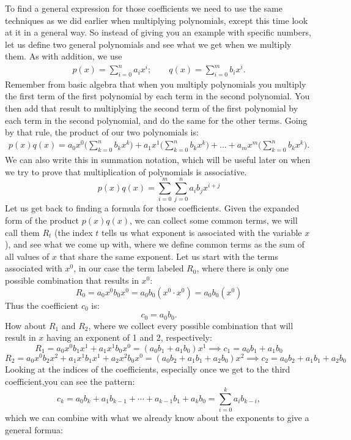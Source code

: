 To find a general expression for those coefficients we need to use the same techniques as we did earlier when multiplying polynomials, except this time look at it in a general way.  So instead of giving you an example with specific numbers, let us define two general polynomials and see what we get when we multiply them. As with addition, we use
\begin{align*}
p(x)  = \sum^{n}_{i=0} a_i x^i; \qquad
q(x)  = \sum^{m}_{i=0} b_i x^i.
\end{align*}	
Remember from basic algebra that when you multiply polynomials you multiply the first term of the first polynomial by each term in the second polynomial.  You then add that result to multiplying the second term of the first polynomial by each term in the second polynomial, and do the same for the other terms.  Going by that rule, the product of our two polynomials is:
\begin{align*}
p(x)q(x)= a_0x^0 \Big( \sum_{k=0}^n b_k x^k\Big) + a_1x^1 \Big(\sum_{k=0}^n b_k x^k \Big) + \ldots + a_mx^m \Big( \sum_{k=0}^n b_k x^k\Big). 
\end{align*}
We can also write this in summation notation, which will be useful later on when we try to prove that multiplication of polynomials is associative.
\[
p(x) q(x) =\sum_{i=0}^{m}\sum_{j=0}^{n}a_i b_j x^{i+j}
\]
Let us get back to finding a formula for those coefficients.  Given the expanded form of the product $p(x)q(x)$, we can collect some common terms, we will call them $R_t$ (the index $t$ tells us what exponent is associated with the variable $x$), and see what we come up with, where we define common terms as the sum of all values of $x$ that share the same exponent.  Let us start with the terms associated with $x^0$, in our case the term labeled $R_0$, where there is only one possible combination that results in $x^0$:
\[ R_0=a_0x^0b_0x^0 = a_0b_0(x^0\cdot x^0)=a_0b_0(x^0) \]
Thus the coefficient $c_0$ is:
\[ c_0= a_0b_0. \]
How about $R_1$ and $R_2$, where we collect every possible combination that will result in $x$ having an exponent of 1 and 2, respectively:
\[ R_1= a_0x^0b_1x^1 + a_1x^1b_0x^0 = (a_0b_1+a_1b_0)x^1  \implies c_1= a_0b_1+a_1b_0 \]
\[R_2= a_0x^0b_2x^2 + a_1x^1b_1x^1 + a_2x^2b_0x^0 = (a_0b_2 + a_1b_1 +a_2b_0)x^2 \implies c_2 = a_0b_2 + a_1b_1 +a_2b_0 \]
Looking at the indices of the coefficients, especially once we get to the third coefficient,you can see the pattern:  
\[
c_k  = a_0  b_k + a_1 b_{k -1} + \cdots + a_{k -1} b _1 + a_k b_0 = \sum_{i = 0}^k a_i b_{k - i},
\]
which we can combine with what we already know about the exponents to give a general formua:

